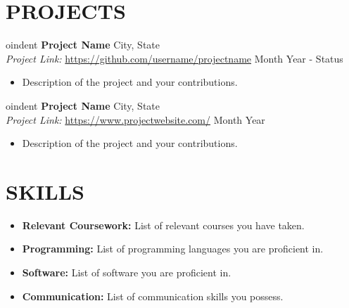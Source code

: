 \documentclass[a4paper,9pt]{extarticle}
\begin{document}
\section*{PROJECTS}

oindent
\textbf{Project Name} \hfill City, State\\ %
\textit{Project Link:} \url{https://github.com/username/projectname} \hfill Month Year - Status %
\begin{itemize}
    \item Description of the project and your contributions. %
\end{itemize}


oindent
\textbf{Project Name} \hfill City, State\\ %
\textit{Project Link:} \url{https://www.projectwebsite.com/} \hfill Month Year %
\begin{itemize}
    \item Description of the project and your contributions. %
\end{itemize}

\section*{SKILLS}
\begin{itemize}
    \item \textbf{Relevant Coursework:} List of relevant courses you have taken. %
    \item \textbf{Programming:} List of programming languages you are proficient in. %
    \item \textbf{Software:} List of software you are proficient in. %
    \item \textbf{Communication:} List of communication skills you possess. %
\end{itemize}

\end{document}
